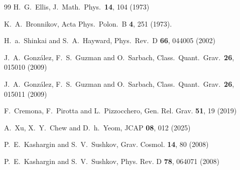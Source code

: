 \documentclass[11pt,a4paper]{article}
\begin{document}
\begin{thebibliography}{99}
  H.~G.~Ellis,
  J.\ Math.\ Phys.\  {\bf 14}, 104 (1973)

  K.~A.~Bronnikov,
  Acta Phys.\ Polon.\ B {\bf 4}, 251 (1973).


  H.~a.~Shinkai and S.~A.~Hayward,
  Phys.\ Rev.\ D {\bf 66}, 044005 (2002)

  J.~A.~Gonz\'alez, F.~S.~Guzman and O.~Sarbach,
  Class.\ Quant.\ Grav.\  {\bf 26}, 015010 (2009)

  J.~A.~Gonz\'alez, F.~S.~Guzman and O.~Sarbach,
  Class.\ Quant.\ Grav.\  {\bf 26},  015011 (2009)

F.~Cremona, F.~Pirotta and L.~Pizzocchero,
Gen. Rel. Grav. \textbf{51}, 19 (2019)

A.~Xu, X.~Y.~Chew and D.~h.~Yeom,
JCAP \textbf{08}, 012 (2025)


  

P.~E.~Kashargin and S.~V.~Sushkov,
Grav. Cosmol. \textbf{14}, 80 (2008)

P.~E.~Kashargin and S.~V.~Sushkov,
Phys. Rev. D \textbf{78}, 064071 (2008)


\end{thebibliography}
\end{document}
